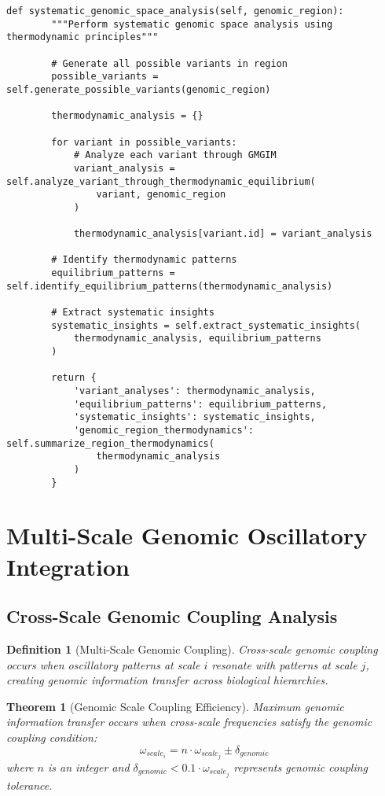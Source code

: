 \documentclass[12pt,a4paper]{article}
\newtheorem{theorem}{Theorem}
\newtheorem{definition}{Definition}
\begin{document}
\begin{lstlisting}[style=pythonstyle, caption=Gas Molecular Genomic Information Model Implementation]
    def systematic_genomic_space_analysis(self, genomic_region):
        """Perform systematic genomic space analysis using thermodynamic principles"""
        
        # Generate all possible variants in region
        possible_variants = self.generate_possible_variants(genomic_region)
        
        thermodynamic_analysis = {}
        
        for variant in possible_variants:
            # Analyze each variant through GMGIM
            variant_analysis = self.analyze_variant_through_thermodynamic_equilibrium(
                variant, genomic_region
            )
            
            thermodynamic_analysis[variant.id] = variant_analysis
        
        # Identify thermodynamic patterns
        equilibrium_patterns = self.identify_equilibrium_patterns(thermodynamic_analysis)
        
        # Extract systematic insights
        systematic_insights = self.extract_systematic_insights(
            thermodynamic_analysis, equilibrium_patterns
        )
        
        return {
            'variant_analyses': thermodynamic_analysis,
            'equilibrium_patterns': equilibrium_patterns,
            'systematic_insights': systematic_insights,
            'genomic_region_thermodynamics': self.summarize_region_thermodynamics(
                thermodynamic_analysis
            )
        }
\end{lstlisting}

\section{Multi-Scale Genomic Oscillatory Integration}

\subsection{Cross-Scale Genomic Coupling Analysis}

\begin{definition}[Multi-Scale Genomic Coupling]
Cross-scale genomic coupling occurs when oscillatory patterns at scale $i$ resonate with patterns at scale $j$, creating genomic information transfer across biological hierarchies.
\end{definition}

\begin{theorem}[Genomic Scale Coupling Efficiency]
Maximum genomic information transfer occurs when cross-scale frequencies satisfy the genomic coupling condition:
\begin{equation}
\omega_{scale_i} = n \cdot \omega_{scale_j} \pm \delta_{genomic}
\end{equation}
where $n$ is an integer and $\delta_{genomic} < 0.1 \cdot \omega_{scale_j}$ represents genomic coupling tolerance.
\end{theorem}
\end{document}
